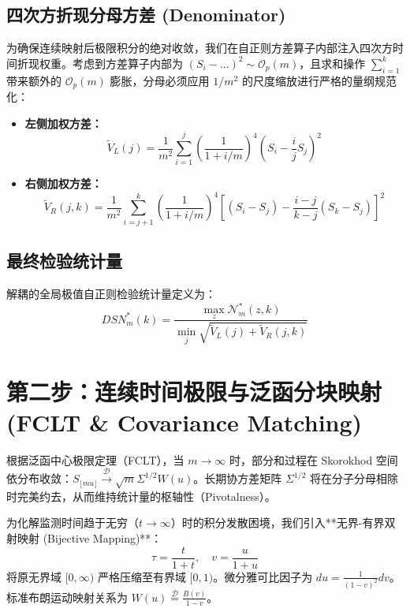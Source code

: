 \documentclass[11pt,a4paper]{article}
\begin{document}
\subsection{四次方折现分母方差 (Denominator)}
为确保连续映射后极限积分的绝对收敛，我们在自正则方差算子内部注入四次方时间折现权重。考虑到方差算子内部为 $(S_i - \dots)^2 \sim \mathcal{O}_p(m)$，且求和操作 $\sum_{i=1}^k$ 带来额外的 $\mathcal{O}_p(m)$ 膨胀，分母必须应用 $1/m^2$ 的尺度缩放进行严格的量纲规范化：
\begin{itemize}
    \item \textbf{左侧加权方差：}
    \begin{equation}
    \tilde{V}_L(j) = \frac{1}{m^2} \sum_{i=1}^j \left( \frac{1}{1 + i/m} \right)^4 \left( S_i - \frac{i}{j} S_j \right)^2
    \end{equation}
    \item \textbf{右侧加权方差：}
    \begin{equation}
    \tilde{V}_R(j, k) = \frac{1}{m^2} \sum_{i=j+1}^k \left( \frac{1}{1 + i/m} \right)^4 \left[ (S_i - S_j) - \frac{i-j}{k-j}(S_k - S_j) \right]^2
    \end{equation}
\end{itemize}

\subsection{最终检验统计量}
解耦的全局极值自正则检验统计量定义为：
\begin{equation}
DSN^*_m(k) = \frac{ \max_{z} \mathcal{N}^*_m(z, k) }{ \min_{j} \sqrt{\tilde{V}_L(j) + \tilde{V}_R(j, k)} }
\end{equation}

\section{第二步：连续时间极限与泛函分块映射 (FCLT \& Covariance Matching)}

根据泛函中心极限定理（FCLT），当 $m \to \infty$ 时，部分和过程在 Skorokhod 空间依分布收敛：$S_{\lfloor m u \rfloor} \xrightarrow{\mathcal{D}} \sqrt{m} \Sigma^{1/2} W(u)$。长期协方差矩阵 $\Sigma^{1/2}$ 将在分子分母相除时完美约去，从而维持统计量的枢轴性（Pivotalness）。

为化解监测时间趋于无穷（$t \to \infty$）时的积分发散困境，我们引入**无界-有界双射映射 (Bijective Mapping)**：
\begin{equation}
\tau = \frac{t}{1+t}, \quad v = \frac{u}{1+u}
\end{equation}
将原无界域 $[0, \infty)$ 严格压缩至有界域 $[0, 1)$。微分雅可比因子为 $du = \frac{1}{(1-v)^2}dv$。标准布朗运动映射关系为 $W(u) \stackrel{\mathcal{D}}{=} \frac{B(v)}{1-v}$。
\end{document}
